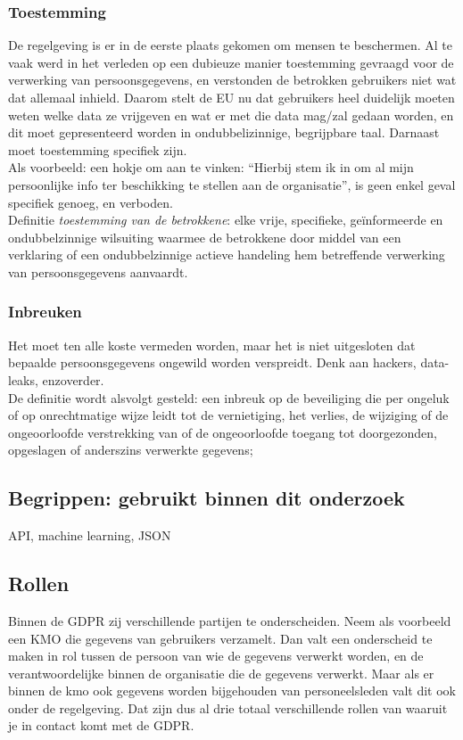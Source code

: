 \subsubsection{Toestemming} 
De regelgeving is er in de eerste plaats gekomen om mensen te beschermen. Al te vaak werd in het verleden op een dubieuze manier toestemming gevraagd voor de verwerking van persoonsgegevens, en verstonden de betrokken gebruikers niet wat dat allemaal inhield. Daarom stelt de EU nu dat gebruikers heel duidelijk moeten weten welke data ze vrijgeven en wat er met die data mag/zal gedaan worden, en dit moet gepresenteerd worden in ondubbelizinnige, begrijpbare taal.
Darnaast moet toestemming specifiek zijn.
\\ Als voorbeeld: een hokje om aan te vinken: “Hierbij stem ik in om al mijn persoonlijke info ter beschikking te stellen aan de organisatie”, is geen enkel geval specifiek genoeg, en verboden.\\ Definitie \textit{toestemming van de betrokkene}: elke vrije, specifieke, geïnformeerde en ondubbelzinnige wilsuiting waarmee de betrokkene door middel van een verklaring of een ondubbelzinnige actieve handeling hem betreffende verwerking van persoonsgegevens aanvaardt. 


\subsubsection{Inbreuken} 
Het moet ten alle koste vermeden worden, maar het is niet uitgesloten dat bepaalde persoonsgegevens ongewild worden verspreidt. Denk aan hackers, data-leaks, enzoverder.
\\ De definitie wordt alsvolgt gesteld: een inbreuk op de beveiliging die per ongeluk of op onrechtmatige wijze leidt tot de vernietiging, het verlies, de wijziging of de ongeoorloofde verstrekking van of de ongeoorloofde toegang tot doorgezonden, opgeslagen of anderszins verwerkte gegevens; 

\subsection{Begrippen: gebruikt binnen dit onderzoek}
API, machine learning, JSON

\subsection{Rollen}
Binnen de GDPR zij verschillende partijen te onderscheiden. Neem als voorbeeld een KMO die gegevens van gebruikers verzamelt. Dan valt een onderscheid te maken in rol tussen de persoon van wie de gegevens verwerkt worden, en de verantwoordelijke binnen de organisatie die de gegevens verwerkt. Maar als er binnen de kmo ook gegevens worden bijgehouden van personeelsleden valt dit ook onder de regelgeving. Dat zijn dus al drie totaal verschillende rollen van waaruit je in contact komt met de GDPR. 

